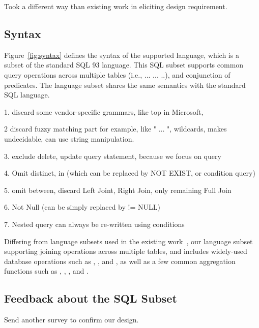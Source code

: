 
Took a different way than existing work in eliciting
design requirement.


\subsection{Syntax}


Figure~\ref{fig:syntax} defines the syntax of the supported language,
which is a subset of the standard SQL 93 language. This SQL subset
supports common query operations across multiple tables (i.e.,
 ...  ... ..), and 
conjunction of predicates. The language
subset shares the same semantics with the standard SQL language.

1. discard some vendor-specific grammars, like top in Microsoft,

2 discard fuzzy matching part for example, like " ... ", wildcards,
makes undecidable, can use string manipulation.

3. exclude delete, update query statement, because we focus on query

4. Omit distinct, in (which can be replaced by NOT EXIST, or condition query)

5. omit between, discard Left Joint, Right Join, only remaining Full Join

6. Not Null (can be simply replaced by != NULL)

7. Nested query can always be re-written using conditions


Differing from language subsets used in the
existing work~\cite{DasSarma:2010}, our language subset
supporting
joining operations across multiple tables, and includes
widely-used database operations such as ,
, and , as
well as a few common aggregation functions such as , ,
, and .


\subsection{Feedback about the SQL Subset}

Send another survey to confirm our design.

